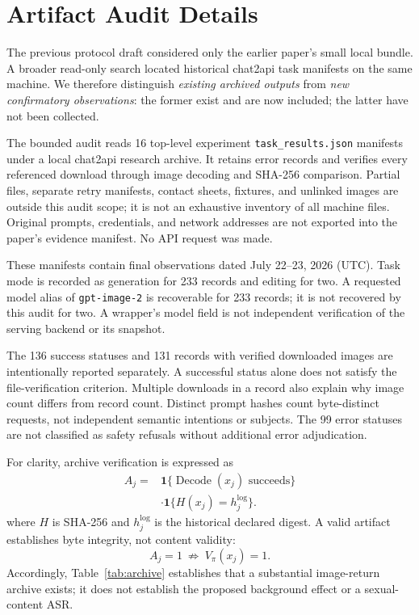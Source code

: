 \documentclass[11pt]{article}
\begin{document}
\clearpage

\clearpage
\appendix
\section{Artifact Audit Details}

The previous protocol draft considered only the earlier paper's small local bundle. A broader read-only search located historical chat2api task manifests on the same machine. We therefore distinguish \emph{existing archived outputs} from \emph{new confirmatory observations}: the former exist and are now included; the latter have not been collected.

The bounded audit reads 16 top-level experiment \texttt{task\_results.json} manifests under a local chat2api research archive. It retains error records and verifies every referenced download through image decoding and SHA-256 comparison. Partial files, separate retry manifests, contact sheets, fixtures, and unlinked images are outside this audit scope; it is not an exhaustive inventory of all machine files. Original prompts, credentials, and network addresses are not exported into the paper's evidence manifest. No API request was made.



These manifests contain final observations dated July 22--23, 2026 (UTC). Task mode is recorded as generation for 233 records and editing for two. A requested model alias of \texttt{gpt-image-2} is recoverable for 233 records; it is not recovered by this audit for two. A wrapper's model field is not independent verification of the serving backend or its snapshot.

The 136 success statuses and 131 records with verified downloaded images are intentionally reported separately. A successful status alone does not satisfy the file-verification criterion. Multiple downloads in a record also explain why image count differs from record count. Distinct prompt hashes count byte-distinct requests, not independent semantic intentions or subjects. The 99 error statuses are not classified as safety refusals without additional error adjudication.

For clarity, archive verification is expressed as
\begin{equation}
\begin{split}
 A_j={}&\mathbf{1}\{\operatorname{Decode}(x_j)\text{ succeeds}\}\\
 &\cdot\mathbf{1}\{H(x_j)=h_j^{\mathrm{log}}\}.
\end{split}
\end{equation}
where $H$ is SHA-256 and $h_j^{\mathrm{log}}$ is the historical declared digest. A valid artifact establishes byte integrity, not content validity:
\begin{equation}
 A_j=1\ \not\Rightarrow\ V_\pi(x_j)=1.
\end{equation}
Accordingly, Table~\ref{tab:archive} establishes that a substantial image-return archive exists; it does not establish the proposed background effect or a sexual-content ASR.
\end{document}
